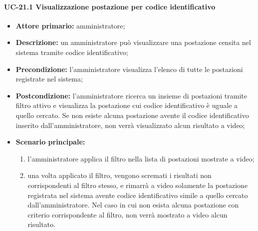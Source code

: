 \paragraph{UC-21.1 Visualizzazione postazione per codice identificativo}
\begin{itemize}
    \item \textbf{Attore primario:} amministratore;
    \item \textbf{Descrizione:} un amministratore pu\`{o} visualizzare una postazione censita nel sistema tramite codice identificativo;
    \item \textbf{Precondizione:} l'amministratore visualizza l'elenco di tutte le postazioni registrate nel sistema;
    \item \textbf{Postcondizione:} l'amministratore ricerca un insieme di postazioni tramite filtro attivo e visualizza la postazione cui codice identificativo è uguale a quello cercato. Se non esiste alcuna postazione avente il codice identificativo inserito dall'amministratore, non verrà visualizzato alcun risultato a video;
    \item \textbf{Scenario principale:}
    \begin{enumerate}
        \item l'amministratore applica il filtro nella lista di postazioni mostrate a video;
        \item una volta applicato il filtro, vengono scremati i risultati non corrispondenti al filtro stesso, e rimarrà a video solamente la postazione registrata nel sistema avente codice identificativo simile a quello cercato dall'amministratore. Nel caso in cui non esista alcuna postazione con criterio corrispondente al filtro, non verrà mostrato a video alcun risultato.
    \end{enumerate}
\end{itemize}


